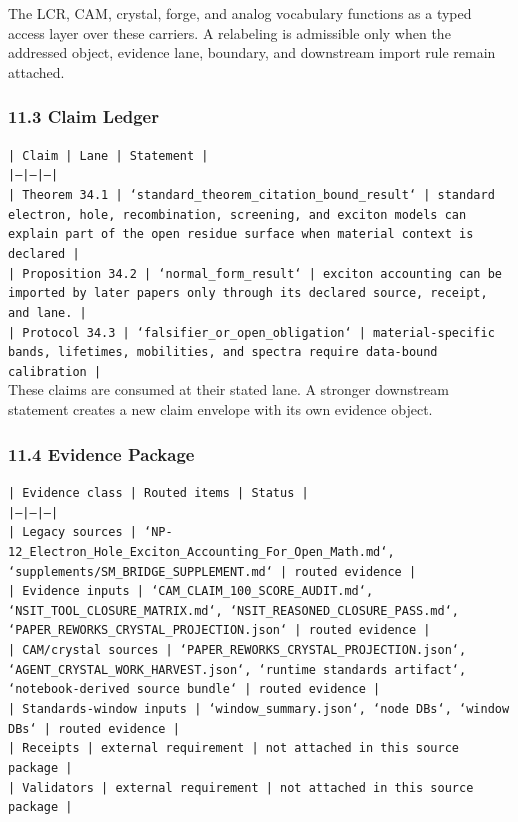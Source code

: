 \documentclass[11pt]{article}
\begin{document}
The LCR, CAM, crystal, forge, and analog vocabulary functions as a typed access
layer over these carriers. A relabeling is admissible only when the addressed
object, evidence lane, boundary, and downstream import rule remain attached.

\subsubsection*{11.3 Claim Ledger}

\noindent\texttt{| Claim | Lane | Statement |}\\
\noindent\texttt{|---|---|---|}\\
\noindent\texttt{| Theorem 34.1 | `standard\_theorem\_citation\_bound\_result` | standard electron, hole, recombination, screening, and exciton models can explain part of the open residue surface when material context is declared |}\\
\noindent\texttt{| Proposition 34.2 | `normal\_form\_result` | exciton accounting can be imported by later papers only through its declared source, receipt, and lane. |}\\
\noindent\texttt{| Protocol 34.3 | `falsifier\_or\_open\_obligation` | material-specific bands, lifetimes, mobilities, and spectra require data-bound calibration |}\\

These claims are consumed at their stated lane. A stronger downstream statement
creates a new claim envelope with its own evidence object.

\subsubsection*{11.4 Evidence Package}

\noindent\texttt{| Evidence class | Routed items | Status |}\\
\noindent\texttt{|---|---|---|}\\
\noindent\texttt{| Legacy sources | `NP-12\_Electron\_Hole\_Exciton\_Accounting\_For\_Open\_Math.md`, `supplements/SM\_BRIDGE\_SUPPLEMENT.md` | routed evidence |}\\
\noindent\texttt{| Evidence inputs | `CAM\_CLAIM\_100\_SCORE\_AUDIT.md`, `NSIT\_TOOL\_CLOSURE\_MATRIX.md`, `NSIT\_REASONED\_CLOSURE\_PASS.md`, `PAPER\_REWORKS\_CRYSTAL\_PROJECTION.json` | routed evidence |}\\
\noindent\texttt{| CAM/crystal sources | `PAPER\_REWORKS\_CRYSTAL\_PROJECTION.json`, `AGENT\_CRYSTAL\_WORK\_HARVEST.json`, `runtime standards artifact`, `notebook-derived source bundle` | routed evidence |}\\
\noindent\texttt{| Standards-window inputs | `window\_summary.json`, `node DBs`, `window DBs` | routed evidence |}\\
\noindent\texttt{| Receipts | external requirement | not attached in this source package |}\\
\noindent\texttt{| Validators | external requirement | not attached in this source package |}\\
\end{document}
